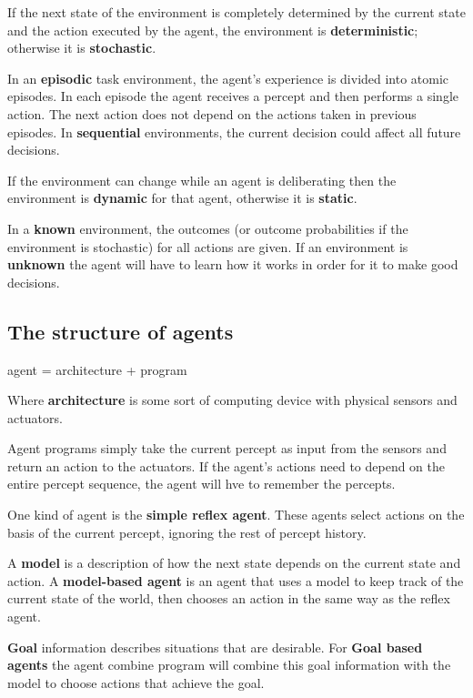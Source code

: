 \documentclass{article}
\begin{document}
If the next state of the environment is completely determined by the current state and the action executed by the agent, the environment is \textbf{deterministic}; otherwise it is \textbf{stochastic}. \newline

In an \textbf{episodic} task environment, the agent's experience is divided into atomic episodes. In each episode the agent receives a percept and then performs a single action. The next action does not depend on the actions taken in previous episodes. In \textbf{sequential} environments, the current decision could affect all future decisions. \newline 

If the environment can change while an agent is deliberating then the environment is \textbf{dynamic} for that agent, otherwise it is \textbf{static}. \newline

In a \textbf{known} environment, the outcomes (or outcome probabilities if the environment is stochastic) for all actions are given. If an environment is \textbf{unknown} the agent will have to learn how it works in order for it to make good decisions.

\subsection{The structure of agents}

agent = architecture + program

Where \textbf{architecture} is some sort of computing device with physical sensors and actuators.

Agent programs simply take the current percept as input from the sensors and return an action to the actuators. If the agent's actions need to depend on the entire percept sequence, the agent will hve to remember the percepts.

One kind of agent is the \textbf{simple reflex agent}. These agents select actions on the basis of the current percept, ignoring the rest of percept history. \

A \textbf{model} is a description of how the next state depends on the current state and action. A \textbf{model-based agent} is an agent that uses a model to keep track of the current state of the world, then chooses an action in the same way as the reflex agent. \newline

\textbf{Goal} information describes situations that are desirable. For \textbf{Goal based agents} the agent combine program will combine this goal information with the model to choose actions that achieve the goal. \newline
\end{document}
